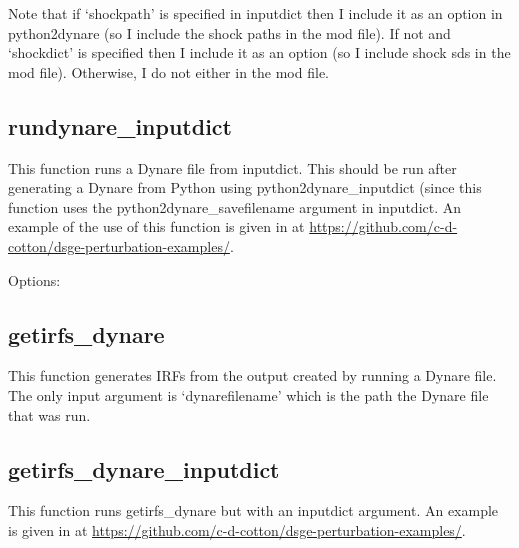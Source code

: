 \documentclass{article}
\theoremstyle{definition}
\begin{document}
Note that if `shockpath' is specified in inputdict then I include it as an option in python2dynare (so I include the shock paths in the mod file). If not and `shockdict' is specified then I include it as an option (so I include shock sds in the mod file). Otherwise, I do not either in the mod file.





\subsection{rundynare\_inputdict}
This function runs a Dynare file from inputdict. This should be run after generating a Dynare from Python using python2dynare\_inputdict (since this function uses the python2dynare\_savefilename argument in inputdict. An example of the use of this function is given in  at \url{https://github.com/c-d-cotton/dsge-perturbation-examples/}.

Options:

\subsection{getirfs\_dynare}
This function generates IRFs from the output created by running a Dynare file. The only input argument is `dynarefilename' which is the path the Dynare file that was run.

\subsection{getirfs\_dynare\_inputdict}
This function runs getirfs\_dynare but with an inputdict argument. An example is given in  at \url{https://github.com/c-d-cotton/dsge-perturbation-examples/}.
\end{document}

